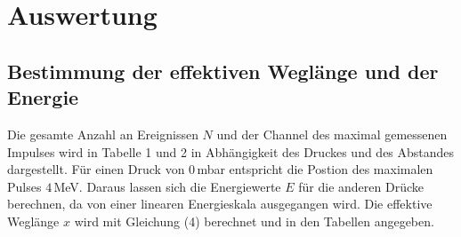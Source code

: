 \section{Auswertung}
\label{sec:Auswertung}
\subsection{Bestimmung der effektiven Weglänge und der Energie}
Die gesamte Anzahl an Ereignissen $N$ und der Channel des maximal gemessenen Impulses wird in Tabelle 1 und 2 in Abhängigkeit des Druckes und
des Abstandes dargestellt. Für einen Druck von $0\,$mbar entspricht die Postion des maximalen Pulses $4\,$MeV. Daraus lassen sich die Energiewerte $E$ für die
anderen Drücke berechnen, da von einer linearen Energieskala ausgegangen wird. Die effektive Weglänge $x$ wird mit Gleichung (4) berechnet und in den Tabellen angegeben.


